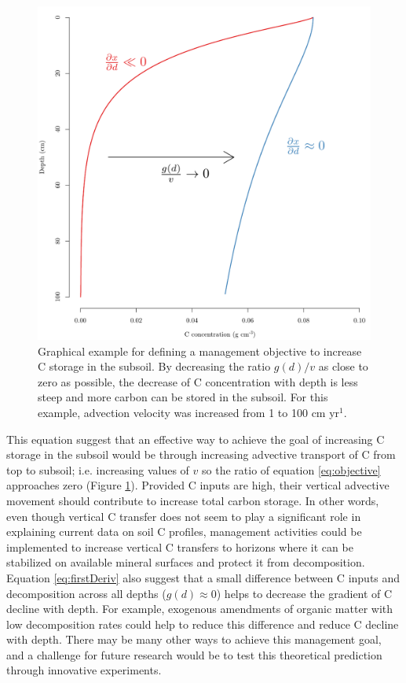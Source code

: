 \documentclass[11pt, oneside, a4paper]{article}   	%
\begin{document}
\begin{figure}[htbp]
   \centering
   \includegraphics[width=\textwidth]{Figures/managementObjective.pdf} %
   \caption{Graphical example for defining a management objective to increase C storage in the subsoil. By decreasing the ratio $g(d)/v$ as close to zero as possible, the decrease of C concentration with depth is less steep and more carbon can be stored in the subsoil. For this example, advection velocity was increased from 1 to 100 cm yr$^{1}$.}
   \label{fig:managementObjective}
\end{figure}

This equation suggest that an effective way to achieve the goal of increasing C storage in the subsoil would be through increasing advective transport of C from top to subsoil; i.e. increasing values of $v$ so the ratio of equation \ref{eq:objective} approaches zero (Figure \ref{fig:managementObjective}). Provided C inputs are high, their vertical advective movement should contribute to increase total carbon storage. In other words, even though vertical C transfer does not seem to play a significant role in explaining current data on soil C profiles, management activities could be implemented to increase vertical C transfers to horizons where it can be stabilized on available mineral surfaces \citep[cf.][]{Ahrens2020, Georgiou2022} and protect it from decomposition. Equation \ref{eq:firstDeriv} also suggest that a small difference between C inputs and decomposition across all depths ($g(d) \approx 0$) helps to decrease the gradient of C decline with depth. For example, exogenous amendments of organic matter with low decomposition rates could help to reduce this difference and reduce C decline with depth. There may be many other ways to achieve this management goal, and a challenge for future research would be to test this theoretical prediction through innovative experiments.
\end{document}

